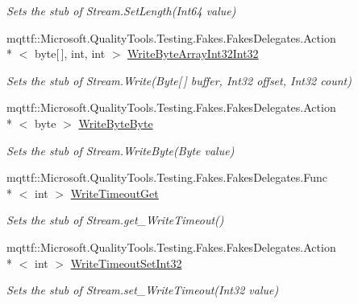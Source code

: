 \begin{DoxyCompactItemize}
\begin{DoxyCompactList}\small\item\em Sets the stub of Stream.\-Set\-Length(\-Int64 value)\end{DoxyCompactList}\item 
mqttf\-::\-Microsoft.\-Quality\-Tools.\-Testing.\-Fakes.\-Fakes\-Delegates.\-Action\\*
$<$ byte\mbox{[}$\,$\mbox{]}, int, int $>$ \hyperlink{class_system_1_1_net_1_1_security_1_1_fakes_1_1_stub_authenticated_stream_a747c71a6d2b0271a10dc86571a255660}{Write\-Byte\-Array\-Int32\-Int32}
\begin{DoxyCompactList}\small\item\em Sets the stub of Stream.\-Write(\-Byte\mbox{[}$\,$\mbox{]} buffer, Int32 offset, Int32 count)\end{DoxyCompactList}\item 
mqttf\-::\-Microsoft.\-Quality\-Tools.\-Testing.\-Fakes.\-Fakes\-Delegates.\-Action\\*
$<$ byte $>$ \hyperlink{class_system_1_1_net_1_1_security_1_1_fakes_1_1_stub_authenticated_stream_a6a1edd1a9fc604ef87a178dd1d8dd403}{Write\-Byte\-Byte}
\begin{DoxyCompactList}\small\item\em Sets the stub of Stream.\-Write\-Byte(\-Byte value)\end{DoxyCompactList}\item 
mqttf\-::\-Microsoft.\-Quality\-Tools.\-Testing.\-Fakes.\-Fakes\-Delegates.\-Func\\*
$<$ int $>$ \hyperlink{class_system_1_1_net_1_1_security_1_1_fakes_1_1_stub_authenticated_stream_a3575c1ec04061d2f66d6e061b19f73ba}{Write\-Timeout\-Get}
\begin{DoxyCompactList}\small\item\em Sets the stub of Stream.\-get\-\_\-\-Write\-Timeout()\end{DoxyCompactList}\item 
mqttf\-::\-Microsoft.\-Quality\-Tools.\-Testing.\-Fakes.\-Fakes\-Delegates.\-Action\\*
$<$ int $>$ \hyperlink{class_system_1_1_net_1_1_security_1_1_fakes_1_1_stub_authenticated_stream_a5193988f395a508e2dffb60b6954a07f}{Write\-Timeout\-Set\-Int32}
\begin{DoxyCompactList}\small\item\em Sets the stub of Stream.\-set\-\_\-\-Write\-Timeout(\-Int32 value)\end{DoxyCompactList}\end{DoxyCompactItemize}
